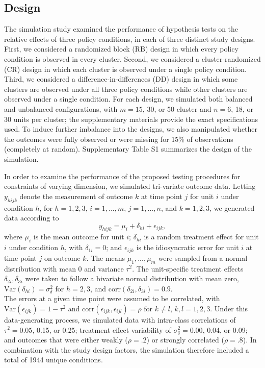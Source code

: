 \documentclass[12pt]{article}
\begin{document}
\hypertarget{design}{%
\subsection{Design}\label{design}}

The simulation study examined the performance of hypothesis tests on the
relative effects of three policy conditions, in each of three distinct
study designs. First, we considered a randomized block (RB) design in
which every policy condition is observed in every cluster. Second, we
considered a cluster-randomized (CR) design in which each cluster is
observed under a single policy condition. Third, we considered a
difference-in-differences (DD) design in which some clusters are
observed under all three policy conditions while other clusters are
observed under a single condition. For each design, we simulated both
balanced and unbalanced configurations, with \(m = 15\), 30, or 50
cluster and \(n = 6\), 18, or 30 units per cluster; the supplementary
materials provide the exact specifications used. To induce further
imbalance into the designs, we also manipulated whether the outcomes
were fully observed or were missing for 15\% of observations (completely
at random). Supplementary Table S1 summarizes the design of the
simulation.

In order to examine the performance of the proposed testing procedures
for constraints of varying dimension, we simulated tri-variate outcome
data. Letting \(y_{hijk}\) denote the measurement of outcome \(k\) at
time point \(j\) for unit \(i\) under condition \(h\), for
\(h = 1,2,3\), \(i = 1,...,m\), \(j = 1,...,n\), and \(k = 1,2,3\), we
generated data according to \begin{equation}
\label{eq:data_generating_model}
y_{hijk} = \mu_{i} + \delta_{hi} + \epsilon_{ijk},
\end{equation} where \(\mu_i\) is the mean outcome for unit \(i\);
\(\delta_{hi}\) is a random treatment effect for unit \(i\) under
condition \(h\), with \(\delta_{1i} = 0\); and \(\epsilon_{ijk}\) is the
idiosyncratic error for unit \(i\) at time point \(j\) on outcome \(k\).
The means \(\mu_1,...,\mu_m\) were sampled from a normal distribution
with mean 0 and variance \(\tau^2\). The unit-specific treatment effects
\(\delta_{2i},\delta_{3i}\) were taken to follow a bivariate normal
distribution with mean zero,
\(\text{Var}\left(\delta_{hi}\right) = \sigma_\delta^2\) for
\(h = 2,3\), and
\(\text{corr}\left(\delta_{2i},\delta_{3i}\right) = 0.9\).\\
The errors at a given time point were assumed to be correlated, with
\(\text{Var}\left(\epsilon_{ijk}\right) = 1 - \tau^2\) and
\(\text{corr}\left(\epsilon_{ijk}, \epsilon_{ijl}\right) = \rho\) for
\(k\neq l\), \(k,l = 1,2,3\). Under this data-generating process, we
simulated data with intra-class correlations of \(\tau^2 = 0.05\), 0.15,
or 0.25; treatment effect variability of \(\sigma_\delta^2 = 0.00\),
0.04, or 0.09; and outcomes that were either weakly (\(\rho = .2\)) or
strongly correlated (\(\rho = .8\)). In combination with the study
design factors, the simulation therefore included a total of 1944 unique
conditions.
\end{document}
